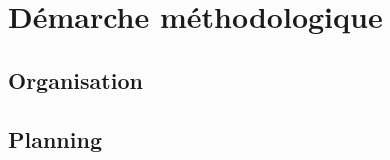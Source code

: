 \chapter{Démarche méthodologique}
\lipsum[17]
\lipsum[19]
\lipsum[23]
\lipsum[29]
\section{Organisation}
\lipsum[2]
\lipsum[3]
\lipsum[5]
\section{Planning}
\lipsum[2]
\lipsum[3]
\lipsum[5]
